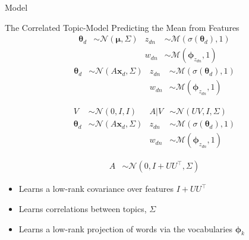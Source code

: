 \documentclass[xcolor=dvipsnames]{beamer}
\newcommand \T { ^\top }
\newcommand \vv[1] { \boldsymbol #1 }
\newcommand \thd[0]  { { \vv \theta_d } }
\newcommand \xd      { { \vv x_d } }
\newcommand \nor[2]   { \mathcal{N} \left( {#1}, {#2} \right) }
\newcommand \mnor[3]  { \mathcal{N} \left(#1, #2, #3\right) }
\newcommand \muln[2]  { \mathcal{M} \left( {#1},{#2} \right) }
\begin{document}
\begin{frame}{Model}

 { The Correlated Topic-Model }
 { Predicting the Mean from Features}
 {
    \begin{align*}
    \vv{\theta}_d & \sim \nor{\vv{\mu}}{\Sigma} & z_{dn} & \sim \muln{\sigma(\thd)}{1} \\
    & & w_{dn} & \sim \muln{\vv{\phi}_{z_{dn}}}{1} 
    \end{align*}
}
 {
    \begin{align*}
    \vv{\theta}_d & \sim \nor{A\xd}{\Sigma} & z_{dn} & \sim \muln{\sigma(\thd)}{1} \\
    & & w_{dn} & \sim \muln{\vv{\phi}_{z_{dn}}}{1} 
    \end{align*}
}

 {
    \begin{align*}
    V & \sim \mnor{0}{I}{I} & A|V & \sim \mnor{UV}{I}{\Sigma} \\
    \vv{\theta}_d & \sim \nor{A\xd}{\Sigma} & z_{dn} & \sim \muln{\sigma(\thd)}{1} \\
    & & w_{dn} & \sim \muln{\vv{\phi}_{z_{dn}}}{1} 
    \end{align*}
}

 {
    \begin{align*}
    A & \sim \mnor{0}{I + UU\T}{\Sigma} 
    \end{align*}
}

 {
    \begin{itemize}
        \item Learns a low-rank covariance over features $I + UU\T$
        \item Learns correlations between topics, $\Sigma$
        \item Learns a low-rank projection of words via the vocabularies $\vv{\phi}_k$
    \end{itemize}
}

\end{frame}
\end{document}
